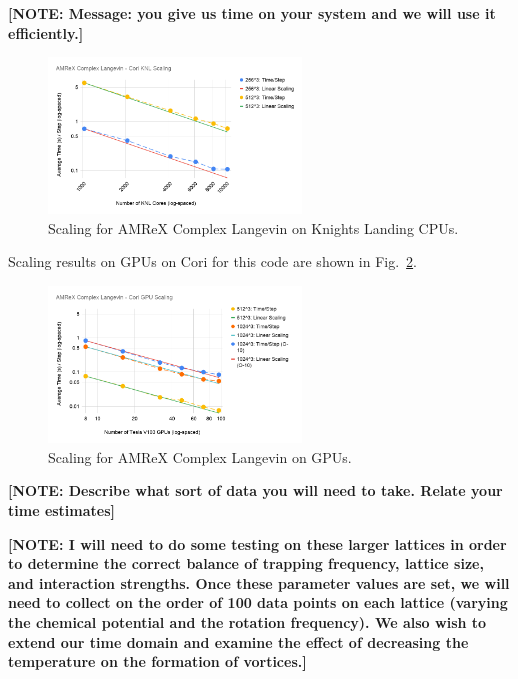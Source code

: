 \documentclass[onecolumn, 12pt]{report}
\newcommand{\note}[1]{{\color{red} \bf[NOTE: #1]}}
\begin{document}
\note{Message: you give us time on your system and we will use it efficiently.}
%
\begin{figure}[h]
\centering
\includegraphics[width=0.6\textwidth]{./AMReX_Complex_Langevin_Cori_KNL_Scaling.png}
\caption{\label{Fig:KNLScaling} Scaling for AMReX Complex Langevin on Knights Landing CPUs.\vspace{-3mm}}
\end{figure}
%
Scaling results on GPUs on Cori for this code are shown in Fig.~\ref{Fig:GPUScaling}. 
%
\begin{figure}[h]
\centering
\includegraphics[width=0.6\textwidth]{./AMReX_Complex_Langevin_Cori_GPU_Scaling.png}
\caption{\label{Fig:GPUScaling} Scaling for AMReX Complex Langevin on GPUs.\vspace{-3mm}}
\end{figure}
%


\note{Describe what sort of data you will need to take. Relate your time estimates}

\note{I will need to do some testing on these larger lattices in order to determine the correct balance of trapping frequency, lattice size, and interaction strengths. Once these parameter values are set, we will need to collect on the order of 100 data points on each lattice (varying the chemical potential and the rotation frequency). We also wish to extend our time domain and examine the effect of decreasing the temperature on the formation of vortices.}
\end{document}
